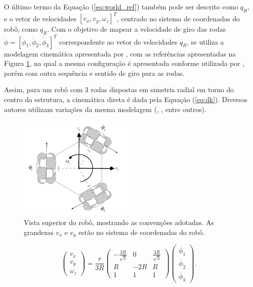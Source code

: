 O último termo da Equação (\ref{eq:world_ref}) também pode ser descrito como $q_R$, e o vetor de velocidades $[v_x, v_y, \omega_z]^T$, centrado no sistema de coordenadas do robô, como $\dot{q_R}$. Com o objetivo de mapear a velocidade de giro das rodas $\dot{\phi} = [\dot{\phi}_1, \dot{\phi}_2, \dot{\phi}_3]^T$ correspondente ao vetor de velocidades $\dot{q_R}$, se utiliza a modelagem cinemática apresentada por \citet{siegwart2011introduction}, com as referências apresentadas na Figura \ref{fig:robo_vel}, na qual a mesma configuração é apresentada conforme utilizada por \citet{ritter2016modelagem}, porém com outra sequência e sentido de giro para as rodas.


Assim, para um robô com 3 rodas dispostas em simetria radial em torno do centro da estrutura, a cinemática direta é dada pela Equação (\ref{eq:dk}). Diversos autores utilizam variações da mesma modelagem (\citet{rojas2006holonomic}, \citet{pin1994new}, entre outros).

\begin{figure}[h!]
  \centering
  \includegraphics[width = 0.5\textwidth]{imagens/robot_vel4}
  \caption{Vista superior do robô, mostrando as convenções adotadas. As grandezas $v_x$ e $v_y$ estão no sistema de coordenadas do robô.}
  \label{fig:robo_vel}
\end{figure}


\begin{equation}
  \begin{pmatrix}
    v_x \\
    v_y \\
    \omega_z
  \end{pmatrix}
  =
  \frac{r}{3R}
  \begin{pmatrix}
    -\frac{3R}{\sqrt{3}} & 0   & \frac{3R}{\sqrt{3}} \\
    R                    & -2R & R                   \\
    1                    & 1   & 1
  \end{pmatrix}
  \begin{pmatrix}
    \dot{\phi_1} \\
    \dot{\phi_2} \\
    \dot{\phi_3}
  \end{pmatrix}.
  \label{eq:dk}
\end{equation}

